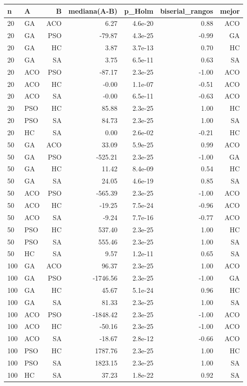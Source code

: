 \begin{tabular}{llrrrrr}
\toprule
n & A & B & mediana(A-B) & p\_Holm & biserial\_rangos & mejor \\
\midrule
20 & GA & ACO & 6.27 & 4.6e-20 & 0.88 & ACO \\
20 & GA & PSO & -79.87 & 4.3e-25 & -0.99 & GA \\
20 & GA & HC & 3.87 & 3.7e-13 & 0.70 & HC \\
20 & GA & SA & 3.75 & 6.5e-11 & 0.63 & SA \\
20 & ACO & PSO & -87.17 & 2.3e-25 & -1.00 & ACO \\
20 & ACO & HC & -0.00 & 1.1e-07 & -0.51 & ACO \\
20 & ACO & SA & -0.00 & 6.5e-11 & -0.63 & ACO \\
20 & PSO & HC & 85.88 & 2.3e-25 & 1.00 & HC \\
20 & PSO & SA & 84.73 & 2.3e-25 & 1.00 & SA \\
20 & HC & SA & 0.00 & 2.6e-02 & -0.21 & HC \\
\midrule
50 & GA & ACO & 33.09 & 5.9e-25 & 0.99 & ACO \\
50 & GA & PSO & -525.21 & 2.3e-25 & -1.00 & GA \\
50 & GA & HC & 11.42 & 8.4e-09 & 0.54 & HC \\
50 & GA & SA & 24.05 & 4.6e-19 & 0.85 & SA \\
50 & ACO & PSO & -565.39 & 2.3e-25 & -1.00 & ACO \\
50 & ACO & HC & -19.25 & 7.5e-24 & -0.96 & ACO \\
50 & ACO & SA & -9.24 & 7.7e-16 & -0.77 & ACO \\
50 & PSO & HC & 537.40 & 2.3e-25 & 1.00 & HC \\
50 & PSO & SA & 555.46 & 2.3e-25 & 1.00 & SA \\
50 & HC & SA & 9.57 & 1.2e-11 & 0.65 & SA \\
\midrule
100 & GA & ACO & 96.37 & 2.3e-25 & 1.00 & ACO \\
100 & GA & PSO & -1746.56 & 2.3e-25 & -1.00 & GA \\
100 & GA & HC & 45.67 & 5.1e-24 & 0.96 & HC \\
100 & GA & SA & 81.33 & 2.3e-25 & 1.00 & SA \\
100 & ACO & PSO & -1848.42 & 2.3e-25 & -1.00 & ACO \\
100 & ACO & HC & -50.16 & 2.3e-25 & -1.00 & ACO \\
100 & ACO & SA & -18.67 & 2.8e-12 & -0.66 & ACO \\
100 & PSO & HC & 1787.76 & 2.3e-25 & 1.00 & HC \\
100 & PSO & SA & 1823.15 & 2.3e-25 & 1.00 & SA \\
100 & HC & SA & 37.23 & 1.8e-22 & 0.92 & SA \\
\bottomrule
\end{tabular}
